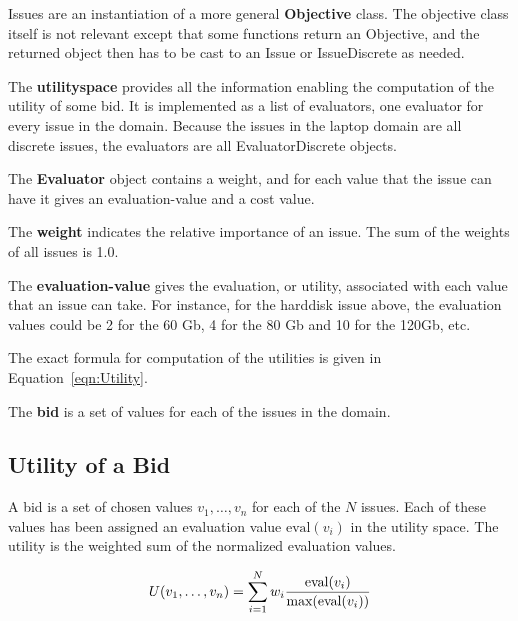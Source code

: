 \documentclass[]{article}
\newcommand\AI[1]{{}} \newcommand\ANAC[1]{{#1}}
\begin{document}
Issues are an instantiation of a more general {\bf Objective} class. The objective class itself is not relevant except that some functions return an Objective, and the returned object then has to be cast to an Issue or IssueDiscrete as needed.

The {\bf utilityspace} provides all the information enabling the computation of the utility of some bid. It is implemented as a list of evaluators, one evaluator for every issue in the domain. Because the issues in the laptop domain are all discrete issues, the evaluators are all EvaluatorDiscrete objects.

The {\bf Evaluator} object contains a weight, and for each value that the issue can have it gives an evaluation-value and a cost value.

The {\bf weight} indicates the relative importance of an issue. The sum of the weights of all issues is 1.0.

The {\bf evaluation-value} gives the evaluation, or utility, associated with each value that an issue can take. For instance, for the harddisk issue above, the evaluation values could be 2 for the 60 Gb, 4 for the 80 Gb and 10 for the 120Gb, etc.

The exact formula for computation of the utilities is given in Equation~\ref{eqn:Utility}.

The {\bf bid} is a set of values for each of the issues in the domain.

\subsection{Utility of a Bid}

A bid is a set of chosen values $v_1, \ldots, v_n$  for each of the $N$ issues. Each of these values has been assigned an evaluation value $\text{eval}(v_i)$ in the utility space. \AI{Sometimes, there are also fixed costs $\text{cost}(v_i)$ associated with each value.} The utility is the weighted sum of the normalized evaluation values\AI{, under the assumption that the cost is below the maximum cost of $M$. If the maximum cost is exceeded, the utility is zero}.

\begin{equation}
	U(v_1, \ldots, v_n) = \sum_{i=1}^{N} w_i \dfrac{\text{eval}(v_i)}{\text{max}(\text{eval}(v_i))}
	\ANAC{\label{eqn:Utility}}
\end{equation}

\AI
{
And when costs are associated with the domain:

\begin{equation}
	\text{Utility}(v_1, \ldots, v_n) = 
		\begin{dcases*}
			U(v_1, \ldots, v_n) & if CostSum$(v_1, \ldots, v_n) \leq M$\\
			0 & if CostSum$(v_1, \ldots, v_n) > M$\\
		\end{dcases*}
		\AI{\label{eqn:Utility}}
\end{equation}


\begin{equation}
	\text{CostSum}(v_1, \ldots, v_n) = \sum_{i=1}^{N} \text{cost}(v_i)
\end{equation}
}
\end{document}
